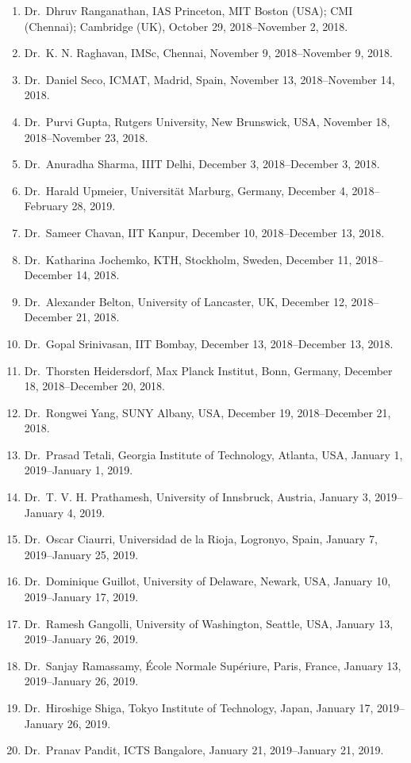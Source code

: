 \begin{enumerate}
\item Dr.~Dhruv Ranganathan, IAS Princeton, MIT Boston (USA); CMI (Chennai); Cambridge (UK), October 29, 2018--November 2, 2018.
\item Dr.~K. N. Raghavan, IMSc, Chennai, November 9, 2018--November 9, 2018.
\item Dr.~Daniel Seco, ICMAT, Madrid, Spain, November 13, 2018--November 14, 2018.
\item Dr.~Purvi Gupta, Rutgers University, New Brunswick, USA, November 18, 2018--November 23, 2018.
\item Dr.~Anuradha Sharma, IIIT Delhi, December 3, 2018--December 3, 2018.
\item Dr.~Harald Upmeier, Universität Marburg, Germany, December 4, 2018--February 28, 2019.
\item Dr.~Sameer Chavan, IIT Kanpur, December 10, 2018--December 13, 2018.
\item Dr.~Katharina Jochemko, KTH, Stockholm, Sweden, December 11, 2018--December 14, 2018.
\item Dr.~Alexander Belton, University of Lancaster, UK, December 12, 2018--December 21, 2018.
\item Dr.~Gopal Srinivasan, IIT Bombay, December 13, 2018--December 13, 2018.
\item Dr.~Thorsten Heidersdorf, Max Planck Institut, Bonn, Germany, December 18, 2018--December 20, 2018.
\item Dr.~Rongwei Yang, SUNY Albany, USA, December 19, 2018--December 21, 2018.
\item Dr.~Prasad Tetali, Georgia Institute of Technology, Atlanta, USA, January 1, 2019--January 1, 2019.
\item Dr.~T. V. H. Prathamesh, University of Innsbruck, Austria, January 3, 2019--January 4, 2019.
\item Dr.~Oscar Ciaurri, Universidad de la Rioja, Logronyo, Spain, January 7, 2019--January 25, 2019.
\item Dr.~Dominique Guillot, University of Delaware, Newark, USA, January 10, 2019--January 17, 2019.
\item Dr.~Ramesh Gangolli, University of Washington, Seattle, USA, January 13, 2019--January 26, 2019.
\item Dr.~Sanjay Ramassamy, École Normale Supériure, Paris, France, January 13, 2019--January 26, 2019.
\item Dr.~Hiroshige Shiga, Tokyo Institute of Technology, Japan, January 17, 2019--January 26, 2019.
\item Dr.~Pranav Pandit, ICTS Bangalore, January 21, 2019--January 21, 2019.

\end{enumerate}
